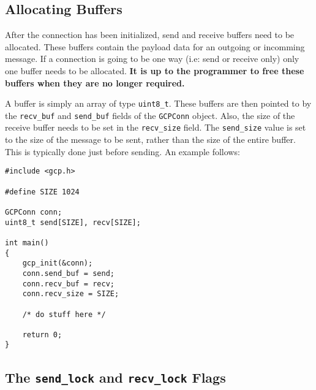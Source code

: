 \documentclass{article}
\begin{document}
\subsection{Allocating Buffers}
After the connection has been initialized, send and receive buffers
need to be allocated.  These buffers contain the payload data for an
outgoing or incomming message.  If a connection is going to be one way
(i.e: send or receive only) only one buffer needs to be allocated.
\textbf{It is up to the programmer to free these buffers when they are
  no longer required.}

A buffer is simply an array of type \texttt{uint8\_t}.  These buffers
are then pointed to by the \texttt{recv\_buf} and \texttt{send\_buf}
fields of the \texttt{GCPConn} object.  Also, the size of the receive
buffer needs to be set in the \texttt{recv\_size} field.  The
\texttt{send\_size} value is set to the size of the message to be
sent, rather than the size of the entire buffer.  This is typically
done just before sending.  An example follows:
\begin{verbatim}
#include <gcp.h>

#define SIZE 1024

GCPConn conn;
uint8_t send[SIZE], recv[SIZE];

int main()
{
    gcp_init(&conn);
    conn.send_buf = send;
    conn.recv_buf = recv;
    conn.recv_size = SIZE;

    /* do stuff here */

    return 0;
}
\end{verbatim}

\subsection{The \texttt{send\_lock} and \texttt{recv\_lock} Flags}
\end{document}
